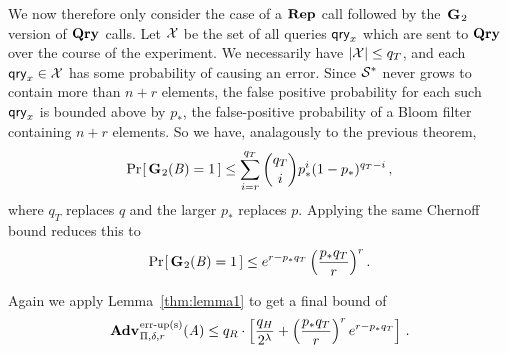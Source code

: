 We now therefore only consider the case of a $\textup{\textbf{Rep}}\hspace{0.5pt}$ call followed by the~$\textup{\textbf{G}}\hspace{0.5pt}_2$ version of $\textup{\textbf{Qry}}\hspace{0.5pt}$ calls. Let $\mathcal{X}$ be the set of all queries $\mathsf{qry}_x$ which are sent to $\textup{\textbf{Qry}}\hspace{0.5pt}$ over the course of the experiment. We necessarily have $|\mathcal{X}| \le q_T$, and each $\mathsf{qry}_x \in \mathcal{X}$ has some probability of causing an error. Since $\mathcal{S}^*$ never grows to contain more than $n+r$ elements, the false positive probability for each such $\mathsf{qry}_x$ is bounded above by $p_*$, the false-positive probability of a Bloom filter containing $n+r$ elements. So we have, analagously to the previous theorem,
\begin{equation}
   \Pr\hspace{-1pt}\left[\,\textup{\textbf{G}}\hspace{0.5pt}_2(\mathit{B})=1\,\right] \le
     \sum_{i=r}^{q_T} \binom{q_T}{i}p_*^i(1-p_*)^{q_T-i} \,,
\end{equation}
where $q_T$ replaces $q$ and the larger $p_*$ replaces $p$. Applying the same Chernoff bound reduces this to
\begin{equation}
   \Pr\hspace{-1pt}\left[\,\textup{\textbf{G}}\hspace{0.5pt}_2(\mathit{B})=1\,\right] \le
     e^{r-p_*q_T}\left(\frac{p_*q_T}{r}\right)^r.
\end{equation}

Again we apply Lemma~\ref{thm:lemma1} to get a final bound of
\begin{equation}
  \Adv{\erreps}_{\Pi,\delta,r}(\advA) \leq
    q_R \cdot \left[
      \frac{q_H}{2^\lambda} +
      \left(\frac{p_*q_T}{r}\right)^re^{r-p_*q_T}
    \right] \,.
\end{equation}
